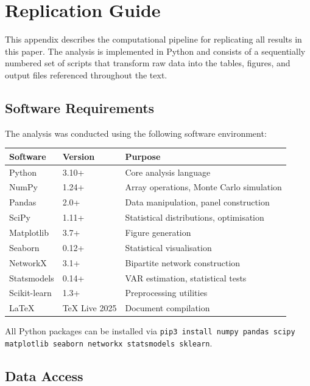 
\section{Replication Guide}
\label{sec:appendix_replication}

This appendix describes the computational pipeline for replicating all results in this paper. The analysis is implemented in Python and consists of a sequentially numbered set of scripts that transform raw data into the tables, figures, and output files referenced throughout the text.


\subsection{Software Requirements}
\label{subsec:software}

The analysis was conducted using the following software environment:

\begin{table}[H]
\centering
\footnotesize
\begin{tabular}{lll}
\toprule
Software & Version & Purpose \\
\midrule
Python & 3.10+ & Core analysis language \\
NumPy & 1.24+ & Array operations, Monte Carlo simulation \\
Pandas & 2.0+ & Data manipulation, panel construction \\
SciPy & 1.11+ & Statistical distributions, optimisation \\
Matplotlib & 3.7+ & Figure generation \\
Seaborn & 0.12+ & Statistical visualisation \\
NetworkX & 3.1+ & Bipartite network construction \\
Statsmodels & 0.14+ & VAR estimation, statistical tests \\
Scikit-learn & 1.3+ & Preprocessing utilities \\
\LaTeX{} & TeX Live 2025 & Document compilation \\
\bottomrule
\end{tabular}
\end{table}

\noindent All Python packages can be installed via \texttt{pip3 install numpy pandas scipy matplotlib seaborn networkx statsmodels sklearn}.


\subsection{Data Access}
\label{subsec:data_access}

